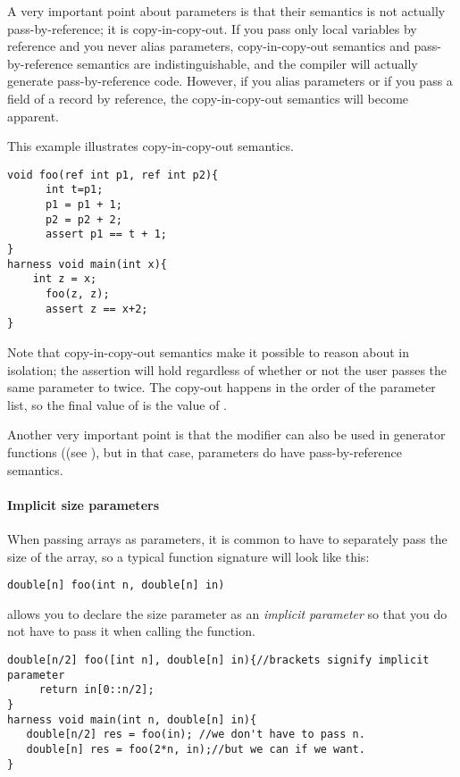 A very important point about  parameters is that their semantics is not actually pass-by-reference; it is copy-in-copy-out. If you pass only local variables by reference and you never alias  parameters, copy-in-copy-out semantics and pass-by-reference semantics are indistinguishable, and the compiler will actually generate pass-by-reference code. However, if you alias parameters or if you pass a field of a record by reference, the copy-in-copy-out semantics will become apparent.

\begin{Example}
This example illustrates copy-in-copy-out semantics.
\begin{lstlisting}
void foo(ref int p1, ref int p2){
      int t=p1;
      p1 = p1 + 1;
      p2 = p2 + 2;
      assert p1 == t + 1;
}
harness void main(int x){
	int z = x;
      foo(z, z); 
      assert z == x+2;
}
\end{lstlisting}
Note that copy-in-copy-out semantics make it possible to reason about  in isolation; the assertion will hold regardless of whether or not the user passes the same parameter to  twice. The copy-out happens in the order of the parameter list, so the final value of  is the value of .
\end{Example}

Another very important point is that the  modifier can also be used in generator functions ((see ), but in that case,  parameters do have pass-by-reference semantics.


\paragraph{Implicit size parameters}

When passing arrays as parameters, it is common to have to separately pass the size of the array, so a typical function signature will look like this:
\begin{lstlisting}
double[n] foo(int n, double[n] in)
\end{lstlisting}

\Sk{} allows you to declare the size parameter  as an \emph{implicit parameter} so that you do not have to pass it when calling the function.

\begin{lstlisting}
double[n/2] foo([int n], double[n] in){//brackets signify implicit parameter
     return in[0::n/2];
}
harness void main(int n, double[n] in){
   double[n/2] res = foo(in); //we don't have to pass n.
   double[n] res = foo(2*n, in);//but we can if we want.
}
\end{lstlisting}

